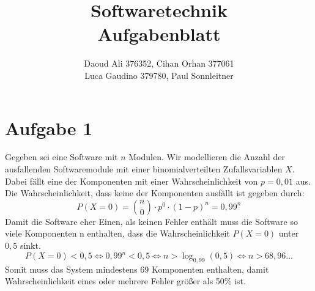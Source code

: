 \documentclass[a4paper,12pt]{article}
\author {Daoud Ali 376352, Cihan Orhan 377061\\ Luca Gaudino 379780, Paul Sonnleitner}
\date {}
\title	{\textbf{Softwaretechnik}\\
		Aufgabenblatt \RM{1}
		}
\newcommand{\aufgabe}[1]{\section*{Aufgabe #1}}
\begin{document}
\doublespacing
\maketitle
\onehalfspacing

\aufgabe{1}
Gegeben sei eine Software mit $n$ Modulen. Wir modellieren die Anzahl der ausfallenden Softwaremodule mit einer binomialverteilten Zufallsvariablen $X$. Dabei fällt eine der Komponenten mit einer Wahrscheinlichkeit von $p=0,01$ aus. Die Wahrscheinlichkeit, dass keine der Komponenten ausfällt ist gegeben durch:
\[
P(X=0) = \binom{n}{0} \cdot p^0 \cdot (1-p)^n =0,99^n
\]
Damit die Software eher Einen, als keinen Fehler enthält muss die Software so viele Komponenten n enthalten, dass die Wahrscheinlichkeit $P(X=0)$ unter $0,5$ sinkt. \\
\[
P(X=0) < 0,5 \Leftrightarrow 0,99^n < 0,5 \Leftrightarrow n > \log_{0,99}(0,5) \Leftrightarrow n > 68,96...
\]
Somit muss das System mindestens 69 Komponenten enthalten, damit Wahrscheinlichkeit eines oder mehrere Fehler größer als 50\% ist.
\end{document}
